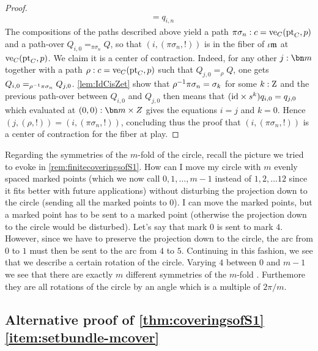 \begin{proof}
\begin{displaymath}
\begin{split}
      &= q_{i,n}
    \end{split}
  \end{displaymath}
  The compositions of the paths described above yield a path
  $\pi\sigma_n: c = \ve_C(\pt_C,p)$ and a path-over
  $Q_{i,0} =_{\pi\sigma_n} Q$, so that $(i,(\pi\sigma_n,!))$ is in the
  fiber of $\iota\mathfrak m$ at $\ve_C(\pt_C,p)$. We claim it is a center of
  contraction. Indeed, for any other $j:\bn m$ together with a path
  $\rho:c=\ve_C(\pt_C,p)$ such that $Q_{j,0}=_\rho Q$, one gets
  $Q_{i,0}=_{\rho^{-1} \pi\sigma_n}Q_{j,0}$. \cref{lem:IdCisZet} show
  that $\rho^{-1}\pi\sigma_n = \sigma_k$ for some $k:\mathrm{Z}$ and the
  previous path-over between $Q_{i,0}$ and $Q_{j,0}$ then means that
  $(\mathord{\mathrm{id}} \times s^k)q_{i,0}=q_{j,0}$ which evaluated at
  $(0,0):\bn m\times Z$ gives the equations $i=j$ and $k=0$. Hence
  $(j,(\rho,!)) = (i,(\pi\sigma_n,!))$, concluding thus the proof that
  $(i,(\pi\sigma_n,!))$ is a center of contraction for the fiber at
  play.

  \end{proof}

  \begin{remark}
    Regarding the symmetries of the $m$-fold \covering of the circle, recall the picture we tried to evoke in \cref{rem:finitecoveringsofS1}.  How can I move my circle with $m$ evenly spaced marked points  (which we now call $0,1,\dots, m-1$ instead of $1,2,\dots 12$ since it fits better with future applications) without disturbing the projection down to the circle (sending all the marked points to $0$).  I can move the marked points, but a marked point has to be sent to a marked point (otherwise the projection down to the circle would be disturbed).  Let's say that mark $0$ is sent to mark $4$.  However, since we have to preserve the projection down to the circle, the arc from $0$ to $1$ must then be sent to the arc from $4$ to $5$.  Continuing in this fashion, we see that we describe a certain rotation of the circle.  Varying $4$ between $0$ and $m-1$ we see that there are exactly $m$ different symmetries of the $m$-fold \covering.  Furthemore they are all rotations of the circle by an angle which is a multiple of $2\pi/m$.
  \end{remark}


\subsection*{Alternative proof of \cref{thm:coveringsofS1}\ref{item:setbundle-mcover}}

